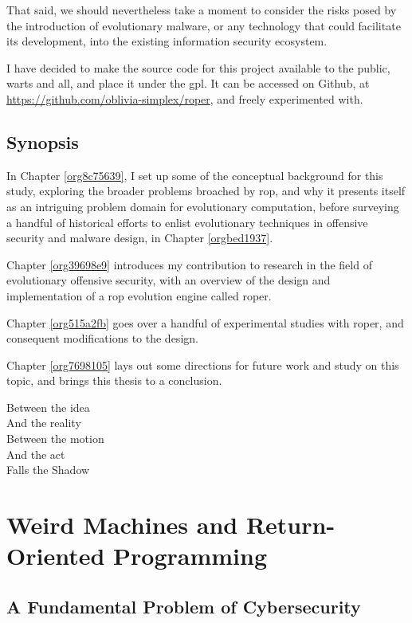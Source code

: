 \documentclass[12pt,glossary]{dalthesis}
\begin{document}
That said, we should nevertheless take a moment to consider the risks posed
by the introduction of evolutionary malware, or any technology that could facilitate
its development, into the existing information security ecosystem.


I have decided to make the source code for this project available to the public,
warts and all, and place it under the \gls{gpl}. It can be accessed on Github,
at \url{https://github.com/oblivia-simplex/roper}, and freely experimented with. 


\section{Synopsis}
\label{sec:org39ae38f}
\label{org9d30922}

In Chapter \ref{org8c75639}, I set up some of the conceptual
background for this study, exploring the broader problems broached by \gls{rop}, 
and why it presents itself as an intriguing problem domain for evolutionary
computation, before surveying a handful of historical efforts to
enlist evolutionary techniques in offensive security and malware
design, in Chapter \ref{orgbed1937}.

Chapter \ref{org39698e9} introduces my contribution to research in the field of
evolutionary offensive security, with an overview of the design and implementation of
a \gls{rop} evolution engine called \gls{roper}.

Chapter \ref{org515a2fb} goes over a handful of experimental studies with
\gls{roper}, and consequent modifications to the design. 

Chapter \ref{org7698105} lays out some directions for future work and study on this
topic, and brings this thesis to a conclusion.



\begin{savequote}
Between the idea\\  
And the reality\\  
Between the motion\\ 
And the act\\
Falls the Shadow
\end{savequote}
\chapter{Weird Machines and Return-Oriented Programming}
\label{sec:org4b56410}
\label{org8c75639}
\label{org5507df5}
\section{A Fundamental Problem of Cybersecurity}
\label{sec:orged1c663}
\label{org71f56ae}
\end{document}
